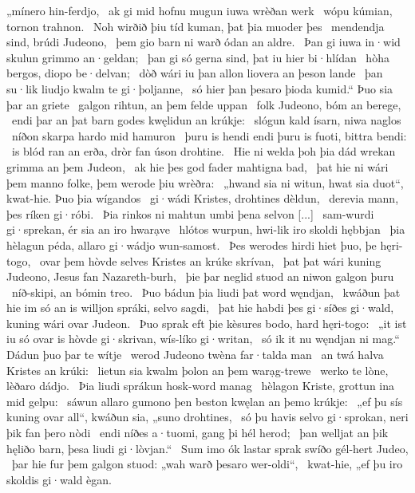 „mínero hin-ferdjo, \hld\ ak gi mid hofnu mugun
iuwa wrèðan werk \hld\ wópu kúmian,
tornon trahnon. \hld\ Noh wirðið þiu tíd kuman,
þat þia muoder þes \hld\ mendendja sind,
brúdi Judeono, \hld\ þem gio barn ni warð
ódan an aldre. \hld\ Þan gi iuwa in·wid skulun
grimmo an·geldan; \hld\ þan gi só gerna sind,
þat iu hier bi·hlídan \hld\ hòha bergos,
diopo be·delvan; \hld\ dòð wári iu þan allon
liovera an þeson lande \hld\ þan su·lik liudjo kwalm
te gi·þoljanne, \hld\ só hier þan þesaro þioda kumid.“
Þuo sia þar an griete \hld\ galgon rihtun,
an þem felde uppan \hld\ folk Judeono,
bóm an berege, \hld\ endi þar an þat barn godes
kwęlidun an krúkje: \hld\ slógun kald ísarn,
niwa naglos \hld\ níðon skarpa
hardo mid hamuron \hld\ þuru is hendi endi þuru is fuoti,
bittra bendi: \hld\ is blód ran an erða,
dròr fan úson drohtine. \hld\ Hie ni welda þoh þia dád wrekan
grimma an þem Judeon, \hld\ ak hie þes god fader
mahtigna bad, \hld\ þat hie ni wári þem manno folke,
þem werode þiu wrèðra: \hld\ „hwand sia ni witun, hwat sia duot“, kwat-hie.
Þuo þia wígandos \hld\ gi·wádi Kristes,
drohtines dèldun, \hld\ derevia mann,
þes ríken gi·róbi. \hld\ Þia rinkos ni mahtun
umbi þena selvon {[...]} \hld\ sam-wurdi gi·sprekan,
ér sia an iro hwarạve \hld\ hlótos wurpun,
hwi-lik iro skoldi hębbjan \hld\ þia hèlagun péda,
allaro gi·wádjo wun-samost. \hld\ Þes werodes hirdi
hiet þuo, þe hęri-togo, \hld\ ovar þem hòvde selves
Kristes an krúke skrívan, \hld\ þat þat wári kuning Judeono,
Jesus fan Nazareth-burh, \hld\ þie þar neglid stuod
an niwon galgon þuru \hld\ níð-skipi,
an bómin treo. \hld\ Þuo bádun þia liudi
þat word węndjan, \hld\ kwáðun þat hie im só an is willjon spráki,
selvo sagdi, \hld\ þat hie habdi þes gi·síðes gi·wald,
kuning wári ovar Judeon. \hld\ Þuo sprak eft þie kèsures bodo,
hard hęri-togo: \hld\ „it ist iu só ovar is hòvde gi·skrivan,
wís-líko gi·writan, \hld\ só ik it nu węndjan ni mag.“
Dádun þuo þar te wítje \hld\ werod Judeono
twèna far·talda man \hld\ an twá halva
Kristes an krúki: \hld\ lietun sia kwalm þolon
an þem warạg-trewe \hld\ werko te lòne,
lèðaro dádjo. \hld\ Þia liudi sprákun
hosk-word manag \hld\ hèlagon Kriste,
grottun ina mid gelpu: \hld\ sáwun allaro gumono þen beston
kwęlan an þemo krúkje: \hld\ „ef þu sís kuning ovar all“, kwáðun sia,
„suno drohtines, \hld\ só þu havis selvo gi·sprokan,
neri þik fan þero nòdi \hld\ endi níðes a·tuomi,
gang þi hél herod; \hld\ þan welljat an þik hęliðo barn,
þesa liudi gi·lòvjan.“ \hld\ Sum imo ók lastar sprak
swíðo gél-hert Judeo, \hld\ þar hie fur þem galgon stuod:
„wah warð þesaro wer-oldi“, \hld\ kwat-hie, „ef þu iro skoldis gi·wald ègan.
